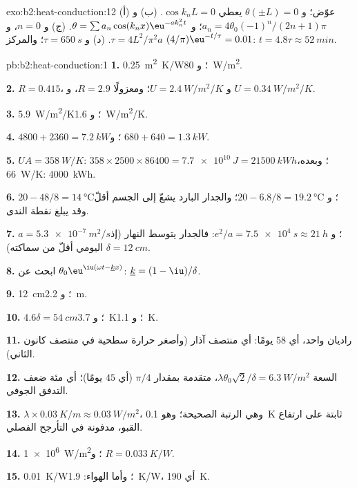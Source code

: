 \begin{solution}{exo:b2:heat-conduction:12}
(أ) عوّض؛ و $\theta(\pm L) = 0$ يعطي $\cos k_nL = 0$. (ب) و $a_n =
4\theta_0(-1)^n/(2n+1)\pi$؛ و $\theta = \sum a_n\cos(k_nx)\eu^{-ak_n^2t}$. (ج) و $n = 0$،
و $\tau = 4L^2/\pi^2a$. (د) و $\tau = \qty{650}{s}$؛ والمركز $(4/\pi)\eu^{-t/\tau} = 0.01$:
$t = 4.8\tau \approx \qty{52}{min}$.
\end{solution}

\begin{solution}{pb:b2:heat-conduction:1}
\textbf{1.} \qty{0.25}{m^2.K/W}؛ و \qty{80}{W/m^2}.

\textbf{2.} $R = 0.415$، و $U = \qty{2.4}{W/m^2/K}$؛ ومعزولًا $R = 2.9$، و $U =
\qty{0.34}{W/m^2/K}$.

\textbf{3.} \qty{5.9}{W/m^2/K}؛ و \qty{1.6}{W/m^2/K}.

\textbf{4.} $4800 + 2360 = \qty{7.2}{kW}$؛ و $680 + 640 = \qty{1.3}{kW}$.

\textbf{5.} $UA = \qty{358}{W/K}$: $358 \times 2500 \times 86400 = \qty{7.7e10}{J} =
\qty{21500}{kWh}$؛ وبعده، \qty{66}{W/K}: \qty{4000}{kWh}.

\textbf{6.} $20 - 48/8 = \qty{14}{\celsius}$؛ و $20 - 6.8/8 = \qty{19.2}{\celsius}$؛
والجدار البارد يشعّ إلى الجسم أقلّ وقد يبلغ نقطة الندى.

\textbf{7.} $a = \qty{5.3e-7}{m^2/s}$؛ و $e^2/a = \qty{7.5e4}{s} \approx \qty{21}{h}$: فالجدار
يتوسط النهار (إذ $\delta = \qty{12}{cm}$ اليومي أقلّ من
سماكته).

\textbf{8.} ابحث عن $\theta_0\eu^{\iu(\omega t - \underline kx)}$: $\underline k = (1 - \iu)/\delta$.

\textbf{9.} \qty{12}{cm}؛ و \qty{2.2}{m}.

\textbf{10.} $4.6\delta = \qty{54}{cm}$؛ و \qty{3.7}{K}؛ و \qty{1.1}{K}.

\textbf{11.} راديان واحد، أي $58$ يومًا: أي منتصف آذار (وأصغر
حرارة سطحية في منتصف كانون الثاني).

\textbf{12.} السعة $\lambda\theta_0\sqrt2/\delta = \qty{6.3}{W/m^2}$، متقدمة بمقدار
$\pi/4$ (أي $45$ يومًا)؛ أي مئة ضعف التدفق الجوفي.

\textbf{13.} $\lambda \times \qty{0.03}{K/m} \approx \qty{0.03}{W/m^2}$، وهي الرتبة الصحيحة؛ وهو
\qty{0.1}{K} ثابتة على ارتفاع القبو، مدفونة في
التأرجح الفصلي.

\textbf{14.} \qty{1e6}{W/m^2}؛ و $R = \qty{0.033}{K/W}$.

\textbf{15.} \qty{0.01}{K/W}؛ وأما الهواء: \qty{1.9}{K/W}، أي \qty{190}{K}.


\end{solution}
